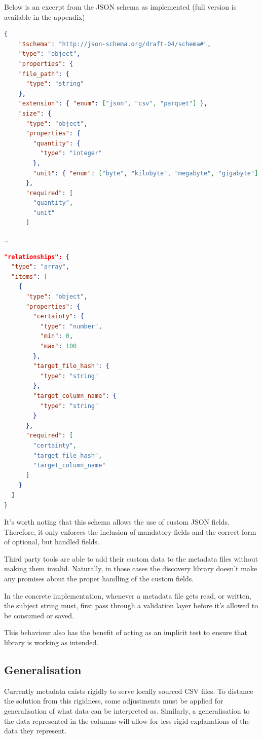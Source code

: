 Below is an excerpt from the JSON schema as implemented (full version is available in the appendix)
\begin{lstlisting}[language=json,firstnumber=1]
{
    "$schema": "http://json-schema.org/draft-04/schema#",
    "type": "object",
    "properties": {
    "file_path": {
      "type": "string"
    },
    "extension": { "enum": ["json", "csv", "parquet"] },
    "size": {
      "type": "object",
      "properties": {
        "quantity": {
          "type": "integer"
        },
        "unit": { "enum": ["byte", "kilobyte", "megabyte", "gigabyte"] }
      },
      "required": [
        "quantity",
        "unit"
      ]
\end{lstlisting}
\ldots
\begin{lstlisting}[language=json,firstnumber=1]
"relationships": {
  "type": "array",
  "items": [
    {
      "type": "object",
      "properties": {
        "certainty": {
          "type": "number",
          "min": 0,
          "max": 100
        },
        "target_file_hash": {
          "type": "string"
        },
        "target_column_name": {
          "type": "string"
        }
      },
      "required": [
        "certainty",
        "target_file_hash",
        "target_column_name"
      ]
    }
  ]
}
\end{lstlisting}

It's worth noting that this schema allows the use of custom JSON fields.
Therefore, it only enforces the inclusion of mandatory fields and the correct form of optional,
but handled fields.

Third party tools are able to add their custom data to the metadata files without making them invalid.
Naturally, in those cases the discovery library doesn't make any promises
about the proper handling of the custom fields.

In the concrete implementation, whenever a metadata file gets read, or written, the
subject string must, first pass through a validation layer before it's allowed to be consumed
or saved.

This behaviour also has the benefit of acting as an implicit test to ensure that library is working
as intended.

\subsection{Generalisation}
Currently metadata exists rigidly to serve locally sourced CSV files.
To distance the solution from this rigidness, some adjustments must be applied for generalisation of what data can be
interpreted as.
Similarly, a generalisation to the data represented in the columns will allow for less rigid explanations of the data
they represent.



